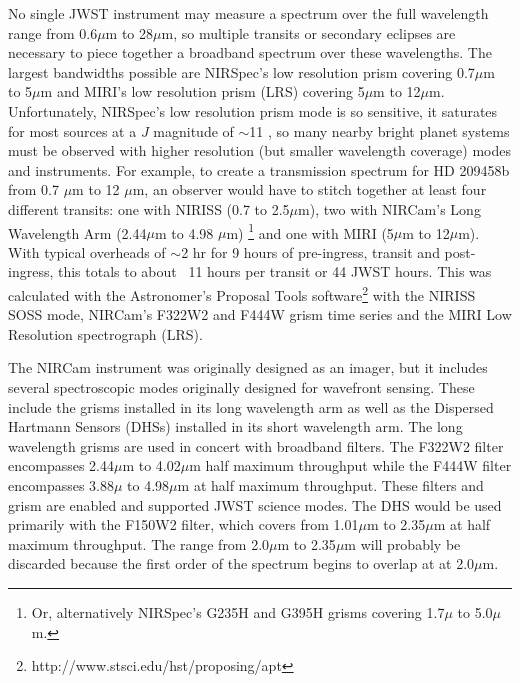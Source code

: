\documentclass{emulateapj}
\begin{document}
No single JWST instrument may measure a spectrum over the full wavelength range from 0.6$\mu$m to 28$\mu$m, so multiple transits or secondary eclipses are necessary to piece together a broadband spectrum over these wavelengths. The largest bandwidths possible are NIRSpec's low resolution prism covering 0.7$\mu$m to 5$\mu$m and MIRI's low resolution prism (LRS) covering 5$\mu$m to 12$\mu$m. Unfortunately, NIRSpec's low resolution prism mode is so sensitive, it saturates for most sources at a $J$ magnitude of $\sim$11 \citep{beichman2014pasp}, so many nearby bright planet systems must be observed with higher resolution (but smaller wavelength coverage) modes and instruments. For example, to create a transmission spectrum for HD 209458b \citep{henry00,charbonneau00} from 0.7 $\mu$m to 12 $\mu$m, an observer would have to stitch together at least four different transits: one with NIRISS (0.7 to 2.5$\mu$m), two with NIRCam's Long Wavelength Arm (2.44$\mu$m to 4.98 $\mu$m) \footnote{Or, alternatively NIRSpec's G235H and G395H  grisms covering 1.7$\mu$ to 5.0$\mu$m.} and one with MIRI (5$\mu$m to 12$\mu$m). With typical overheads of $\sim$2 hr for 9 hours of pre-ingress, transit and post-ingress, this totals to about ~11 hours per transit or 44 JWST hours. This was calculated with the Astronomer's Proposal Tools software\footnote{http://www.stsci.edu/hst/proposing/apt} with the NIRISS SOSS mode, NIRCam's F322W2 and F444W grism time series and the MIRI Low Resolution spectrograph (LRS).

The NIRCam instrument was originally designed as an imager, but it includes several spectroscopic modes originally designed for wavefront sensing. These include the grisms installed in its long wavelength arm as well as the Dispersed Hartmann Sensors (DHSs) installed in its short wavelength arm. The long wavelength grisms are used in concert with broadband filters. The F322W2 filter encompasses 2.44$\mu$m to 4.02$\mu$m half maximum throughput while the F444W filter encompasses 3.88$\mu$ to 4.98$\mu$m at half maximum throughput. These filters and grism are enabled and supported JWST science modes. The DHS would be used primarily with the F150W2 filter, which covers from 1.01$\mu$m to 2.35$\mu$m at half maximum throughput. The range from 2.0$\mu$m to 2.35$\mu$m will probably be discarded because the first order of the spectrum begins to overlap at at 2.0$\mu$m.
\end{document}
